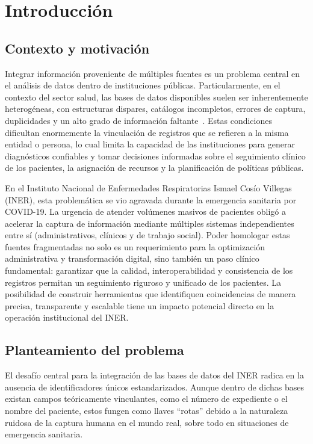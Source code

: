 \chapter{Introducción}

\section{Contexto y motivación}
Integrar información proveniente de múltiples fuentes es un problema central en el análisis de datos dentro de instituciones públicas. Particularmente, en el contexto del sector salud, las bases de datos disponibles suelen ser inherentemente heterogéneas, con estructuras dispares, catálogos incompletos, errores de captura, duplicidades y un alto grado de información faltante~\cite{cappuzzo2020,ong2014}. Estas condiciones dificultan enormemente la vinculación de registros que se refieren a la misma entidad o persona, lo cual limita la capacidad de las instituciones para generar diagnósticos confiables y tomar decisiones informadas sobre el seguimiento clínico de los pacientes, la asignación de recursos y la planificación de políticas públicas.

\noindent En el Instituto Nacional de Enfermedades Respiratorias Ismael Cosío Villegas (INER), esta problemática se vio agravada durante la emergencia sanitaria por COVID\mbox{-}19. La urgencia de atender volúmenes masivos de pacientes obligó a acelerar la captura de información mediante múltiples sistemas independientes entre sí (administrativos, clínicos y de trabajo social).
Poder homologar estas fuentes fragmentadas no solo es un requerimiento para la optimización administrativa y transformación digital, sino también un paso clínico fundamental: garantizar que la calidad, interoperabilidad y consistencia de los registros permitan un seguimiento riguroso y unificado de los pacientes. La posibilidad de construir herramientas que identifiquen coincidencias de manera precisa, transparente y escalable tiene un impacto potencial directo en la operación institucional del INER.

\section{Planteamiento del problema}
El desafío central para la integración de las bases de datos del INER radica en la ausencia de identificadores únicos estandarizados. Aunque dentro de dichas bases  existan campos teóricamente vinculantes, como el número de expediente o el nombre del paciente, estos fungen como llaves ``rotas'' debido a la naturaleza ruidosa de la captura humana en el mundo real, sobre todo en situaciones de emergencia sanitaria.

